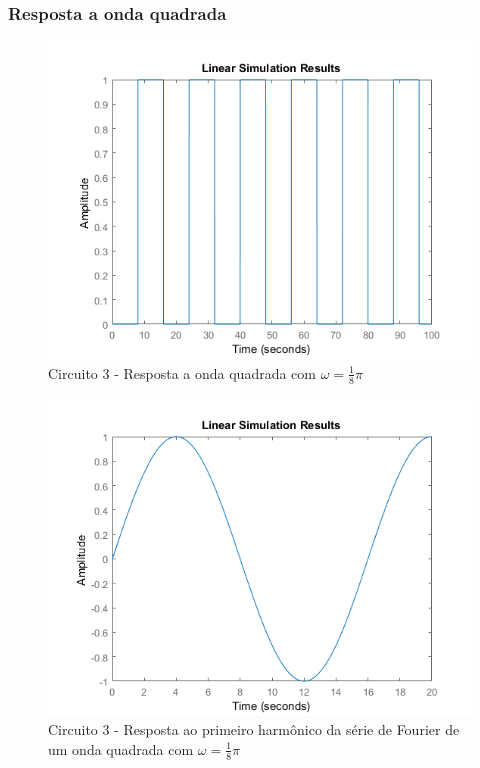 \documentclass[a4paper, 12pt]{article}
\begin{document}
			\subsubsection{Resposta a onda quadrada}
			\begin{figure}[!ht]
				\centering
				\includegraphics[scale=0.71]{img/1i_circ3.png}
				\caption{Circuito 3 - Resposta a onda quadrada com $\omega = \frac{1}{8}\pi$}	
			\end{figure}			
			\begin{figure}[!ht]
				\centering
				\includegraphics[scale=0.71]{img/1j_circ3.png}
				\caption{Circuito 3 - Resposta ao primeiro harmônico da série de Fourier de um onda quadrada com $\omega = \frac{1}{8}\pi$}	
			\end{figure}		
\end{document}
